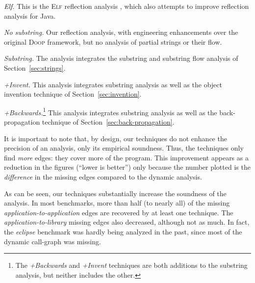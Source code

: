 \begin{asparaenum}
\item \emph{Elf.} This is the \textsc{Elf} reflection analysis
  \cite{ecoop/LiTSX14}, which also attempts to improve reflection
  analysis for Java. 
\item \emph{No substring.} Our reflection analysis, with 
  engineering enhancements over the original \textsc{Doop} framework,
  but no analysis of partial strings or their flow.
\item \emph{Substring.} The analysis integrates the substring and
  substring flow analysis of Section~\ref{sec:strings}.
\item \emph{+Invent.} This analysis integrates substring analysis as well as the
  object invention technique of Section~\ref{sec:invention}.
\item \emph{+Backwards.}\footnote{The \emph{+Backwards} and
    \emph{+Invent} techniques %
    are both additions to the substring analysis, but neither includes
    the other.} This analysis integrates substring analysis as well as
  the back-propagation technique of
  Section~\ref{sec:back-propagation}.
\end{asparaenum}


It is important to note that, by design, our techniques
do not enhance the precision of an analysis, only its empirical
soundness.  Thus, the techniques
only find \emph{more} edges: they cover more of the
program. This improvement appears as a reduction in the figures
(``lower is better'') only because the number plotted is the
\emph{difference} in the missing edges compared to the dynamic
analysis.


  As can be seen, our techniques substantially increase the soundness
  of the analysis.  In most benchmarks, more than half (to nearly all)
  of the missing \emph{application-to-application} edges are
  recovered by at least one technique. The
  \emph{application-to-library} missing edges also decreased, although
  not as much.  In fact, the \emph{eclipse} benchmark was hardly being
  analyzed in the past, since most of the dynamic call-graph was
  missing.


